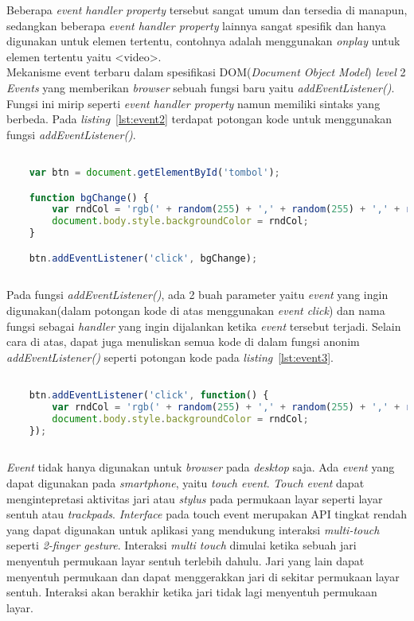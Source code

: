 Beberapa \textit{event handler property} tersebut sangat umum dan tersedia di manapun, sedangkan beberapa \textit{event handler property} lainnya sangat spesifik dan hanya digunakan untuk elemen tertentu, contohnya adalah menggunakan \textit{onplay} untuk elemen tertentu yaitu <video>.\\

Mekanisme event terbaru dalam spesifikasi DOM(\textit{Document Object Model}) \textit{level} 2 \textit{Events} yang memberikan \textit{browser} sebuah fungsi baru yaitu \textit{addEventListener()}. Fungsi ini mirip seperti \textit{event handler property} namun memiliki sintaks yang berbeda. Pada \textit{listing}~\ref{lst:event2} terdapat potongan kode untuk menggunakan fungsi \textit{addEventListener()}.

\begin{lstlisting}[language=Javascript, caption=Menggunakan fungsi \textit{addEventListener()}, label={lst:event2}]

	var btn = document.getElementById('tombol');

	function bgChange() {
  		var rndCol = 'rgb(' + random(255) + ',' + random(255) + ',' + random(255) + ')';
  		document.body.style.backgroundColor = rndCol;
	}   

	btn.addEventListener('click', bgChange);
	
\end{lstlisting}

Pada fungsi \textit{addEventListener()}, ada 2 buah parameter yaitu \textit{event} yang ingin digunakan(dalam potongan kode di atas menggunakan \textit{event click}) dan nama fungsi sebagai \textit{handler} yang ingin dijalankan ketika \textit{event} tersebut terjadi. Selain cara di atas, dapat juga menuliskan semua kode di dalam fungsi anonim \textit{addEventListener()} seperti potongan kode pada \textit{listing}~\ref{lst:event3}.

\begin{lstlisting}[language=Javascript, caption=Menuliskan kode di dalam fungsi anonim pada \textit{method addEventListener()}, label={lst:event3}]

	btn.addEventListener('click', function() {
  		var rndCol = 'rgb(' + random(255) + ',' + random(255) + ',' + random(255) + ')';
  		document.body.style.backgroundColor = rndCol;
	});
	
\end{lstlisting}

\textit{Event} tidak hanya digunakan untuk \textit{browser} pada \textit{desktop} saja. Ada \textit{event} yang dapat digunakan pada \textit{smartphone}, yaitu \textit{touch event}. \textit{Touch event} dapat mengintepretasi aktivitas jari atau \textit{stylus} pada permukaan layar seperti layar sentuh atau \textit{trackpads}. \textit{Interface} pada touch event merupakan API tingkat rendah yang dapat digunakan untuk aplikasi yang mendukung interaksi \textit{multi-touch} seperti \textit{2-finger gesture}. Interaksi \textit{multi touch} dimulai ketika sebuah jari menyentuh permukaan layar sentuh terlebih dahulu. Jari yang lain dapat menyentuh permukaan dan dapat menggerakkan jari di sekitar permukaan layar sentuh. Interaksi akan berakhir ketika jari tidak lagi menyentuh permukaan layar.\\

